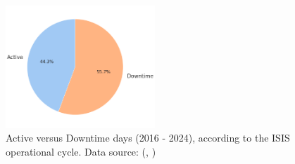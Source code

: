 \documentclass[10pt,oneside]{report}
\renewcommand{\citet}[1]{\citeauthor{#1}, \citeyear{#1}}
\begin{document}
\begin{figure}[htbp]
    \centering
    \includegraphics[width=0.5\textwidth]{isisDowntime.png}
    \caption{Active versus Downtime days (2016 - 2024), according to the ISIS operational cycle. Data source: (\citet{isisbeamoperations2024})}\label{fig:isisDowntime}
\end{figure}



\end{document}
